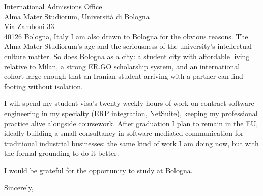 \begin{letter}{
  International Admissions Office\\
  Alma Mater Studiorum, Università di Bologna\\
  Via Zamboni 33\\
  40126 Bologna, Italy
}
I am also drawn to Bologna for the obvious reasons. The Alma Mater Studiorum's age and the seriousness of the university's intellectual culture matter. So does Bologna as a city: a student city with affordable living relative to Milan, a strong ER.GO scholarship system, and an international cohort large enough that an Iranian student arriving with a partner can find footing without isolation.

I will spend my student visa's twenty weekly hours of work on contract software engineering in my specialty (ERP integration, NetSuite), keeping my professional practice alive alongside coursework. After graduation I plan to remain in the EU, ideally building a small consultancy in software-mediated communication for traditional industrial businesses: the same kind of work I am doing now, but with the formal grounding to do it better.

I would be grateful for the opportunity to study at Bologna.

\closing{Sincerely,}

\end{letter}


